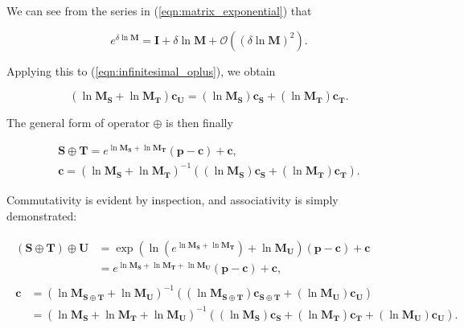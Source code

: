         We can see from the series in (\ref{eqn:matrix_exponential}) that
        
        \begin{equation}
          e^{\delta \ln \mathbf{M}} = \mathbf{I} + \delta \ln \mathbf{M} + \mathcal{O}((\delta \ln \mathbf{M})^2).
        \end{equation}
        
        Applying this to (\ref{eqn:infinitesimal_oplus}), we obtain
        
        \begin{equation}
          (\ln\mathbf{M_S} + \ln\mathbf{M_T})\mathbf{c_U} = (\ln\mathbf{M_S})\mathbf{c_S} + (\ln\mathbf{M_T})\mathbf{c_T}.
        \end{equation}
        
        The general form of operator $\oplus$ is then finally
        
        \begin{gather}
          \mathbf{S} \oplus \mathbf{T} = e^{\ln\mathbf{M_S} + \ln\mathbf{M_T}}(\mathbf{p} - \mathbf{c}) + \mathbf{c}, \nonumber \\
          \mathbf{c} = (\ln\mathbf{M_S} + \ln\mathbf{M_T})^{-1}((\ln\mathbf{M_S})\mathbf{c_S} + (\ln\mathbf{M_T})\mathbf{c_T}). \label{eqn:affine_oplus}
        \end{gather}
        
        Commutativity is evident by inspection, and associativity is simply demonstrated:
        
        \begin{gather}
          \begin{split}
            (\mathbf{S} \oplus \mathbf{T}) \oplus \mathbf{U} &= \exp(\ln(e^{\ln\mathbf{M_S} + \ln\mathbf{M_T}}) + \ln\mathbf{M_U})(\mathbf{p} - \mathbf{c}) + \mathbf{c} \\
                                                             &= e^{\ln\mathbf{M_S} + \ln\mathbf{M_T} + \ln\mathbf{M_U}}(\mathbf{p} - \mathbf{c}) + \mathbf{c},
          \end{split} \\
          \begin{split}
            \mathbf{c} &= (\ln\mathbf{M_{S \oplus T}} + \ln\mathbf{M_U})^{-1}((\ln\mathbf{M_{S \oplus T}})\mathbf{c_{S \oplus T}} + (\ln\mathbf{M_U})\mathbf{c_U}) \\
                       &= (\ln\mathbf{M_S} + \ln\mathbf{M_T} + \ln\mathbf{M_U})^{-1}((\ln\mathbf{M_S})\mathbf{c_S} + (\ln\mathbf{M_T})\mathbf{c_T} + (\ln\mathbf{M_U})\mathbf{c_U}).
          \end{split}
        \end{gather}
        
